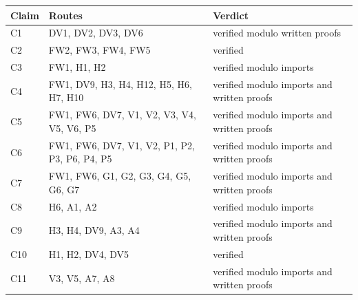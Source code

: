 \begin{ruledtabular}
\begin{tabular}{lp{}p{}}
Claim & Routes & Verdict \\
\hline
C1 & DV1, DV2, DV3, DV6 & verified modulo written proofs \\
C2 & FW2, FW3, FW4, FW5 & verified \\
C3 & FW1, H1, H2 & verified modulo imports \\
C4 & FW1, DV9, H3, H4, H12, H5, H6, H7, H10 & verified modulo imports and written proofs \\
C5 & FW1, FW6, DV7, V1, V2, V3, V4, V5, V6, P5 & verified modulo imports and written proofs \\
C6 & FW1, FW6, DV7, V1, V2, P1, P2, P3, P6, P4, P5 & verified modulo imports and written proofs \\
C7 & FW1, FW6, G1, G2, G3, G4, G5, G6, G7 & verified modulo imports and written proofs \\
C8 & H6, A1, A2 & verified modulo imports \\
C9 & H3, H4, DV9, A3, A4 & verified modulo imports and written proofs \\
C10 & H1, H2, DV4, DV5 & verified \\
C11 & V3, V5, A7, A8 & verified modulo imports and written proofs \\
\end{tabular}
\end{ruledtabular}
